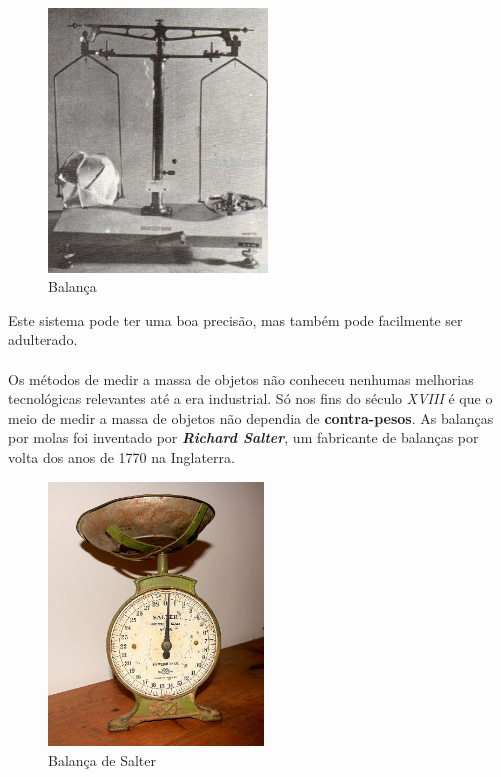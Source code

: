 \begin{minipage}[!b]{0.45\linewidth}
	\begin{figure}[H]
		\centering
		\includegraphics[height=7cm]{./image/PESTA/general/balanca_4.jpg}
		\caption{Balança}
		\label{balanca_4}
	\end{figure}
\end{minipage}
\newline
\newline
\newline
Este sistema pode ter uma boa precisão, mas também pode facilmente ser adulterado.
\\
\\
Os métodos de medir a massa de objetos não conheceu nenhumas melhorias tecnológicas relevantes até a era industrial. Só nos fins do século \textit{XVIII} é que o meio de medir a massa de objetos não dependia de \textbf{contra-pesos}. As balanças por molas foi inventado por \textbf{\textit{Richard Salter}}, um fabricante de balanças por volta dos anos de 1770 na Inglaterra.\\
\begin{figure}[H]
	\centering
	\includegraphics[height=7cm]{./image/PESTA/general/Weigh_Scale_Salter_1.jpg}
	\caption{Balança de Salter}
	\label{Weigh_Scale_Salter_1}
\end{figure}
